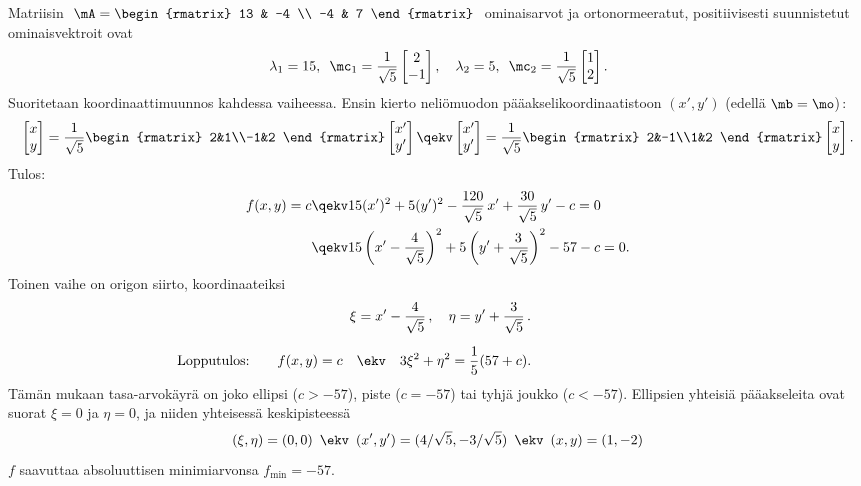 Matriisin $\ \displaystyle{\mA=\begin{rmatrix} 13 & -4 \\ -4 & 7 \end{rmatrix}}\ $ ominaisarvot
ja ortonormeeratut, positiivisesti suunnistetut ominaisvektroit ovat
\[
\lambda_1=15,\,\ \mc_1=\frac{1}{\sqrt{5}}\begin{bmatrix} 2 \\ -1 \end{bmatrix},\quad
\lambda_2= 5,\,\ \mc_2=\frac{1}{\sqrt{5}}\begin{bmatrix} 1 \\ 2 \end{bmatrix}.
\]
Suoritetaan koordinaattimuunnos kahdessa vaiheessa. Ensin kierto neliömuodon
pääakselikoordinaatistoon $(x',y')$ (edellä $\mb=\mo$)\,: 
\[
\begin{bmatrix} x\\y \end{bmatrix} =
\frac{1}{\sqrt{5}}\begin{rmatrix} 2&1\\-1&2 \end{rmatrix}
\begin{bmatrix} x'\\y' \end{bmatrix} \qekv
\begin{bmatrix} x'\\y' \end{bmatrix} =
\frac{1}{\sqrt{5}}\begin{rmatrix} 2&-1\\1&2 \end{rmatrix}
\begin{bmatrix} x\\y \end{bmatrix}.
\]
Tulos:
\begin{align*}
f(x,y)=c &\qekv 15(x')^2+5(y')^2-\frac{120}{\sqrt{5}}\,x'+\frac{30}{\sqrt{5}}\,y'-c=0 \\
         &\qekv 15\left(x'-\frac{4}{\sqrt{5}}\right)^2
                +5\left(y'+\frac{3}{\sqrt{5}}\right)^2-57-c=0.
\end{align*}
Toinen vaihe on origon siirto, koordinaateiksi
\begin{align*}
\xi &= x'-\frac{4}{\sqrt{5}}\,, \quad \eta=y'+\frac{3}{\sqrt{5}}\,. \\[2mm]
\text{Lopputulos:} \qquad f(x,y) = c \quad
    &\ekv\quad 3\xi^2+\eta^2=\frac{1}{5}(57+c). \hspace{4.2cm}
\end{align*}
Tämän mukaan tasa-arvokäyrä on joko ellipsi ($c>-57$), piste ($c=-57$) tai tyhjä joukko
($c<-57$). Ellipsien
yhteisiä pääakseleita ovat suorat $\xi=0$ ja $\eta=0$, ja niiden yhteisessä keskipisteessä
\[
(\xi,\eta)=(0,0)\,\ \ekv\,\ (x',y')=(4/\sqrt{5},-3/\sqrt{5})\,\ \ekv\,\ (x,y)=(1,-2)
\]
$f$ saavuttaa absoluuttisen minimiarvonsa $f_{\text{min}}=-57$. \loppu
\vspace{4mm}


